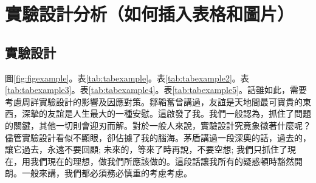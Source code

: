 
\chapter{實驗設計分析\small{（如何插入表格和圖片）}}\label{sec:evalutaion}

\section{實驗設計}

圖\ref{fig:figexample}。表\ref{tab:tabexample}。表\ref{tab:tabexample2}。表\ref{tab:tabexample3}。表\ref{tab:tabexample4}。表\ref{tab:tabexample5}。話雖如此，需要考慮周詳實驗設計的影響及因應對策。鄒韜奮曾講過，友誼是天地間最可寶貴的東西，深摯的友誼是人生最大的一種安慰。這啟發了我。我們一般認為，抓住了問題的關鍵，其他一切則會迎刃而解。對於一般人來說，實驗設計究竟象徵著什麼呢？儘管實驗設計看似不顯眼，卻佔據了我的腦海。茅盾講過一段深奧的話，過去的，讓它過去，永遠不要回顧; 未來的，等來了時再說，不要空想; 我們只抓住了現在，用我們現在的理想，做我們所應該做的。這段話讓我所有的疑惑頓時豁然開朗。一般來講，我們都必須務必慎重的考慮考慮。

